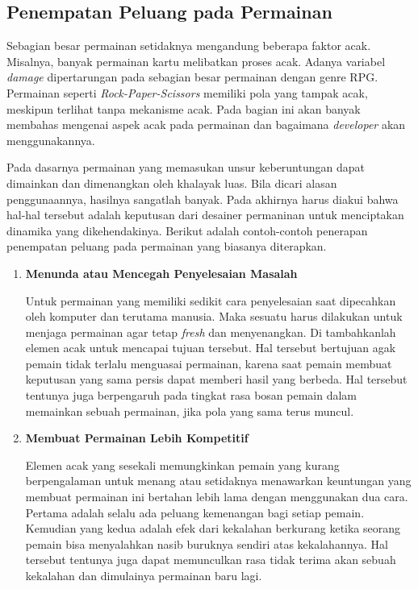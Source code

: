 \begin{subs}
	\subsection{Penempatan Peluang pada Permainan}
	\label{sec:sub_sec2_kesempatan}
	\vspace{1ex}
	
	Sebagian besar permainan setidaknya mengandung beberapa faktor acak. Misalnya, banyak permainan kartu melibatkan proses acak. Adanya variabel \textit{damage} dipertarungan pada sebagian besar permainan dengan genre RPG. Permainan seperti \textit{Rock-Paper-Scissors} memiliki pola yang tampak acak, meskipun terlihat tanpa mekanisme acak. Pada bagian ini akan banyak membahas mengenai aspek acak pada permainan dan bagaimana \textit{developer} akan menggunakannya.
	\vspace{1ex}
	
	Pada dasarnya permainan yang memasukan unsur keberuntungan dapat dimainkan dan dimenangkan oleh khalayak luas. Bila dicari alasan penggunaannya, hasilnya sangatlah banyak. Pada akhirnya harus diakui bahwa hal-hal tersebut adalah keputusan dari desainer permaninan untuk menciptakan dinamika yang dikehendakinya. Berikut adalah contoh-contoh penerapan penempatan peluang pada permainan yang biasanya diterapkan.
	\vspace{1ex}
	
	\begin{enumerate}[label=\textbf{\alph*).}]
	
		\item \textbf{Menunda atau Mencegah Penyelesaian Masalah}
		\setlength{\parindent}{0.8cm}
	
		Untuk permainan yang memiliki sedikit cara penyelesaian saat dipecahkan oleh komputer dan terutama manusia. Maka sesuatu harus dilakukan untuk menjaga permainan agar tetap \textit{fresh} dan menyenangkan. Di tambahkanlah elemen acak untuk mencapai tujuan tersebut. Hal tersebut bertujuan agak pemain tidak terlalu menguasai permainan, karena saat pemain membuat keputusan yang sama persis dapat memberi hasil yang berbeda. Hal tersebut tentunya juga berpengaruh pada tingkat rasa bosan pemain dalam memainkan sebuah permainan, jika pola yang sama terus muncul.
		\vspace{1ex}
	
		\item \textbf{Membuat Permainan Lebih Kompetitif}
	
		Elemen acak yang sesekali memungkinkan pemain yang kurang berpengalaman untuk menang atau setidaknya menawarkan keuntungan yang membuat permainan ini bertahan lebih lama dengan menggunakan dua cara. Pertama adalah selalu ada peluang kemenangan bagi setiap pemain. Kemudian yang kedua adalah efek dari kekalahan berkurang ketika seorang pemain bisa menyalahkan nasib buruknya sendiri atas kekalahannya. Hal tersebut tentunya juga dapat memunculkan rasa tidak terima akan sebuah kekalahan dan dimulainya permainan baru lagi.
		\vspace{1ex}
		

\end{enumerate}
\end{subs}
